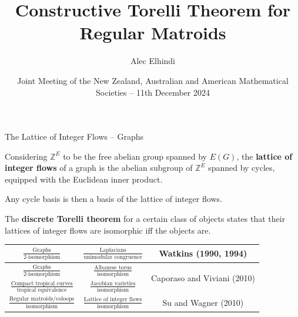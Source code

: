 \documentclass[9pt]{beamer}
\title{Constructive Torelli Theorem for Regular Matroids}
\author{Alec Elhindi}
\institute{University of Sydney}
\date{Joint Meeting of the New Zealand, Australian and American Mathematical Societies -- 11th December 2024}
\def\Z{\mathbb Z}
\begin{document}
    \begin{frame}

        \titlepage

    \end{frame}

    \begin{frame}{The Lattice of Integer Flows -- Graphs}

        Considering $\Z^E$ to be the free abelian group spanned by $E(G)$, the \textbf{lattice of integer flows} of a graph is the abelian subgroup of $\Z^E$ spanned by cycles, equipped with the Euclidean inner product.

        \pause

        \vspace{12pt}
        
        Any cycle basis is then a basis of the lattice of integer flows.

        \pause

        \vspace{12pt}

        The \textbf{discrete Torelli theorem} for a certain class of objects states that their lattices of integer flows are isomorphic iff the objects are.

        \pause

        \vspace{12pt}

        \begin{center}

            \begin{tabular}{c|c|c}
                $\frac{\text{Graphs}}{\text{2-isomorphism}}$ & $\frac{\text{Laplacians}}{\text{unimodular congruence}}$ & Watkins (1990, 1994)\pause\\
                \hline
                $\frac{\text{Graphs}}{\text{2-isomorphism}}$ & $\frac{\text{Albanese torus}}{\text{isomorphism}}$ & \multirow{2}{*}{Caporaso and Viviani (2010)}\\
                $\frac{\text{Compact tropical curves}}{\text{tropical equivalence}}$ & $\frac{\text{Jacobian varieties}}{\text{isomorphism}}$ & \pause\\
                \hline
                $\frac{\text{Regular matroids/coloops}}{\text{isomorphism}}$ & $\frac{\text{Lattice of integer flows}}{\text{isomorphism}}$ & Su and Wagner (2010)
            \end{tabular}

        \end{center}
        
    \end{frame}
\end{document}
